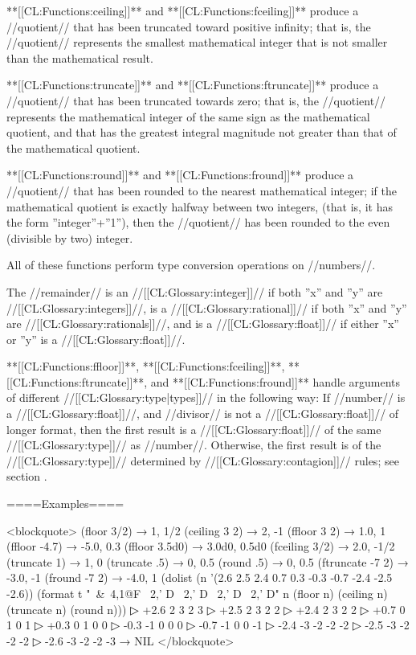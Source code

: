 **[[CL:Functions:ceiling]]** and **[[CL:Functions:fceiling]]** produce a //quotient// that has been truncated toward positive infinity; that is, the //quotient// represents the smallest mathematical integer that is not smaller than the mathematical result.


**[[CL:Functions:truncate]]** and **[[CL:Functions:ftruncate]]** produce a //quotient// that has been truncated towards zero; that is, the //quotient// represents the mathematical integer of the same sign as the mathematical quotient, and that has the greatest integral magnitude not greater than that of the mathematical quotient.


**[[CL:Functions:round]]** and **[[CL:Functions:fround]]** produce a //quotient// that has been rounded to the nearest mathematical integer; if the mathematical quotient is exactly halfway between two integers, (that is, it has the form ''integer''+''1''), then the //quotient// has been rounded to the even (divisible by two) integer.

\endlist

All of these functions perform type conversion operations on //numbers//.

The //remainder// is an //[[CL:Glossary:integer]]// if both ''x'' and ''y'' are //[[CL:Glossary:integers]]//, is a //[[CL:Glossary:rational]]// if both ''x'' and ''y'' are //[[CL:Glossary:rationals]]//, and is a //[[CL:Glossary:float]]// if either ''x'' or ''y'' is a //[[CL:Glossary:float]]//.

**[[CL:Functions:ffloor]]**, **[[CL:Functions:fceiling]]**, **[[CL:Functions:ftruncate]]**, and **[[CL:Functions:fround]]** handle arguments of different //[[CL:Glossary:type|types]]// in the following way: If //number// is a //[[CL:Glossary:float]]//, and //divisor// is not a //[[CL:Glossary:float]]// of longer format, then the first result is a //[[CL:Glossary:float]]// of the same //[[CL:Glossary:type]]// as //number//. Otherwise, the first result is of the //[[CL:Glossary:type]]// determined by //[[CL:Glossary:contagion]]// rules; see section {\secref\NumericContagionRules}.

====Examples====

<blockquote> (floor 3/2) → 1, 1/2 (ceiling 3 2) → 2, -1 (ffloor 3 2) → 1.0, 1 (ffloor -4.7) → -5.0, 0.3 (ffloor 3.5d0) → 3.0d0, 0.5d0 (fceiling 3/2) → 2.0, -1/2 (truncate 1) → 1, 0 (truncate .5) → 0, 0.5 (round .5) → 0, 0.5 (ftruncate -7 2) → -3.0, -1 (fround -7 2) → -4.0, 1 (dolist (n '(2.6 2.5 2.4 0.7 0.3 -0.3 -0.7 -2.4 -2.5 -2.6)) (format t "~&~4,1@F ~2,' D ~2,' D ~2,' D ~2,' D" n (floor n) (ceiling n) (truncate n) (round n)))
▷ +2.6 2 3 2 3
▷ +2.5 2 3 2 2
▷ +2.4 2 3 2 2
▷ +0.7 0 1 0 1
▷ +0.3 0 1 0 0
▷ -0.3 -1 0 0 0
▷ -0.7 -1 0 0 -1
▷ -2.4 -3 -2 -2 -2
▷ -2.5 -3 -2 -2 -2
▷ -2.6 -3 -2 -2 -3 → NIL </blockquote>

